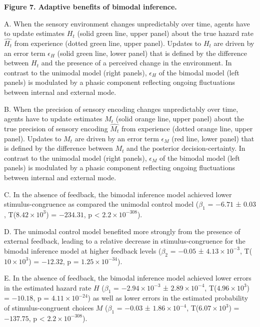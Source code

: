\documentclass[
]{article}
\begin{document}
\textbf{Figure 7. Adaptive benefits of bimodal inference.}

A. When the sensory environment changes unpredictably over time, agents
have to update estimates \(H_t\) (solid green line, upper panel) about
the true hazard rate \(\hat{H_t}\) from experience (dotted green line,
upper panel). Updates to \(H_t\) are driven by an error term
\(\epsilon_H\) (solid green line, lower panel) that is defined by the
difference between \(H_t\) and the presence of a perceived change in the
environment. In contrast to the unimodal model (right panels),
\(\epsilon_H\) of the bimodal model (left panels) is modulated by a
phasic component reflecting ongoing fluctuations between internal and
external mode.

B. When the precision of sensory encoding changes unpredictably over
time, agents have to update estimates \(M_t\) (solid orange line, upper
panel) about the true precision of sensory encoding \(\hat{M_t}\) from
experience (dotted orange line, upper panel). Updates to \(M_t\) are
driven by an error term \(\epsilon_M\) (red line, lower panel) that is
defined by the difference between \(M_t\) and the posterior
decision-certainty. In contrast to the unimodal model (right panels),
\(\epsilon_M\) of the bimodal model (left panels) is modulated by a
phasic component reflecting ongoing fluctuations between internal and
external mode.

C. In the absence of feedback, the bimodal inference model achieved
lower stimulus-congruence as compared the unimodal control model
(\(\beta_1\) = \(-6.71\) ± \(0.03\),
T(\(\ensuremath{8.42\times 10^{3}}\)) = \(-234.31\), p < \(\ensuremath{2.2\times 10^{-308}}\)).

D. The unimodal control model benefited more strongly from the presence
of external feedback, leading to a relative decrease in
stimulus-congruence for the bimodal inference model at higher feedback
levels (\(\beta_2\) = \(-0.05\) ± \(\ensuremath{4.13\times 10^{-3}}\),
T(\(\ensuremath{10\times 10^{3}}\)) = \(-12.32\), p =
\(\ensuremath{1.25\times 10^{-34}}\)).

E. In the absence of feedback, the bimodal inference model achieved
lower errors in the estimated hazard rate \(H\) (\(\beta_1\) =
\(\ensuremath{-2.94\times 10^{-3}}\) ±
\(\ensuremath{2.89\times 10^{-4}}\),
T(\(\ensuremath{4.96\times 10^{3}}\)) = \(-10.18\), p =
\(\ensuremath{4.11\times 10^{-24}}\)) as well as lower errors in the
estimated probability of stimulus-congruent choices \(M\) (\(\beta_1\) =
\(-0.03\) ± \(\ensuremath{1.86\times 10^{-4}}\),
T(\(\ensuremath{6.07\times 10^{3}}\)) = \(-137.75\), p < \(\ensuremath{2.2\times 10^{-308}}\)).
\end{document}
